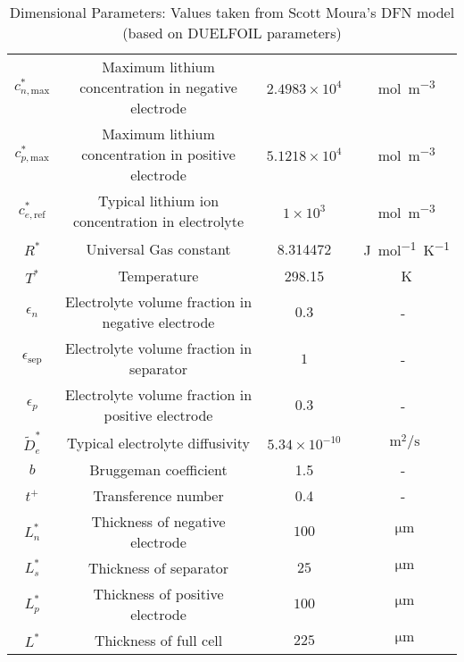 \documentclass[preprint]{elsarticle}
\begin{document}
\begin{table}[h]
\begin{tabular}{|c|c|c|c|}
        $c_{n,\text{max}}^*$ & Maximum lithium concentration in negative electrode & $2.4983\times 10^4$ & \SI{}{\mol \metre^{-3}} \\ 
        $c_{p,\text{max}}^*$ & Maximum lithium concentration in positive electrode & $5.1218\times 10^4$ & \SI{}{\mol \metre^{-3}} \\    
        $c_{e,\text{ref}}^*$ & Typical lithium ion concentration in electrolyte & $1\times10^3$ & \SI{}{\mol \metre^{-3}} \\ 
        $R^*$ & Universal Gas constant & 8.314472 & \SI{}{\joule \mol^{-1} \kelvin^{-1}}\\
        $T^*$ & Temperature & 298.15 & \SI{}{\kelvin} \\
        $\epsilon_n$ & Electrolyte volume fraction in negative electrode & $0.3$ & -\\
        $\epsilon_{\text{sep}}$ & Electrolyte volume fraction in separator & $1$ & -\\
        $\epsilon_p$ & Electrolyte volume fraction in positive electrode & $0.3$ & -\\
        $\tilde{D}_e^*$ & Typical electrolyte diffusivity & $5.34\times10^{-10}$ & $\SI{}{\metre^{2}/\second}$ \\
        $b$ & Bruggeman coefficient & 1.5 & - \\
        $t^+$ & Transference number & 0.4 & - \\
        $L_n^*$ & Thickness of negative electrode &$100$ & $\SI{}{\micro\metre}$  \\
        $L_{s}^*$ & Thickness of separator &$25$ & $\SI{}{\micro\metre}$ \\
        $L_p^*$ & Thickness of positive electrode &$100$ & $\SI{}{\micro\metre}$  \\ 
        $L^*$ & Thickness of full cell & $225$ & $\SI{}{\micro\metre}$ \\ \hline
    \end{tabular} 
    \caption{Dimensional Parameters: Values taken from Scott Moura's DFN model (based on DUELFOIL parameters)} \label{tab:dimensional}
\end{table}
\end{document}
